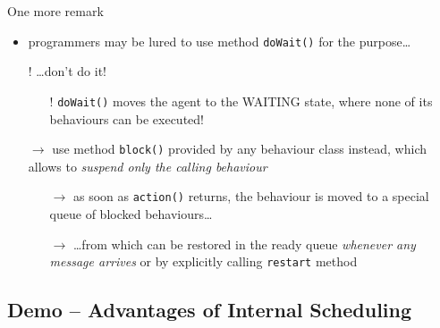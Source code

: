 \documentclass{beamer}\mode<presentation>{\usetheme{AMSCesenaPurpleAndGold}}
\begin{document}
\begin{frame}[c,allowframebreaks]
\begin{block}{One more remark}
\begin{itemize}
            \item programmers may be lured to use method \texttt{doWait()} for the purpose\ldots
            \item[!] \ldots don't do it!
            \begin{itemize}
                \item[!] \texttt{doWait()} moves the agent to the WAITING state, where none of its behaviours can be executed!
            \end{itemize}
            \item[$\rightarrow$] use method \alert{\texttt{block()}} provided by any behaviour class instead, which allows to \emph{suspend only the calling behaviour}
            \begin{itemize}
                \item[$\rightarrow$] as soon as \texttt{action()} returns, the behaviour is moved to a special queue of blocked behaviours\ldots
                \item[$\rightarrow$] \ldots from which can be restored in the ready queue \emph{whenever any message arrives} or by explicitly calling \texttt{restart} method
            \end{itemize}
        \end{itemize}
    \end{block}
\end{frame}

\startDemo

\subsection{Demo \currentDemo{} -- Advantages of Internal Scheduling}
\end{document}
